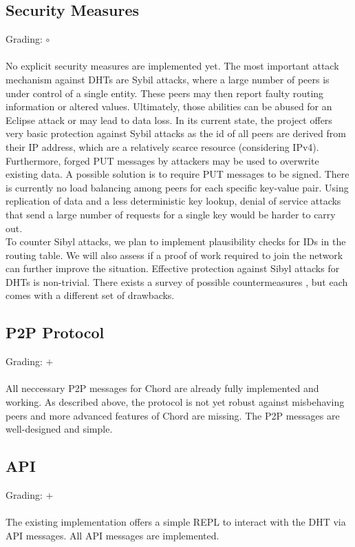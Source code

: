 \documentclass[a4paper, 11pt]{article}
\begin{document}
\subsection*{Security Measures}
Grading: $\circ$\\
\\
No explicit security measures are implemented yet.
The most important attack mechanism against DHTs are Sybil attacks, where a large number of peers is under control of a single entity. 
These peers may then report faulty routing information or altered values. 
Ultimately, those abilities can be abused for an Eclipse attack or may lead to data loss.
In its current state, the project offers very basic protection against Sybil attacks as the id of all peers are derived from their IP address, which are a relatively scarce resource (considering IPv4).
\\
Furthermore, forged PUT messages by attackers may be used to overwrite existing data.
A possible solution is to require PUT messages to be signed.
There is currently no load balancing among peers for each specific key-value pair. 
Using replication of data and a less deterministic key lookup, denial of service attacks that send a large number of requests for a single key would be harder to carry out.
\\
To counter Sibyl attacks, we plan to implement plausibility checks for IDs in the routing table.
We will also assess if a proof of work required to join the network can further improve the situation.
Effective protection against Sibyl attacks for DHTs is non-trivial.
There exists a survey of possible countermeasures \cite{urdaneta2011survey}, but each comes with a different set of drawbacks.


\subsection*{P2P Protocol}
Grading: $+$\\
\\
All neccessary P2P messages for Chord are already fully implemented and working.
As described above, the protocol is not yet robust against misbehaving peers and more advanced features of Chord are missing. 
The P2P messages are well-designed and simple.


\subsection*{API}
Grading: $+$\\
\\
The existing implementation offers a simple REPL to interact with the DHT via API messages.
All API messages are implemented.
\end{document}

